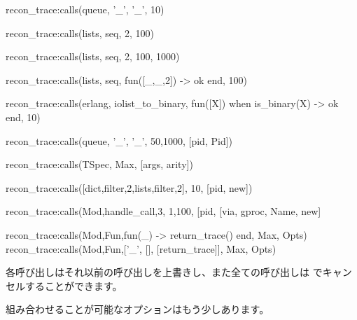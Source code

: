 \begin{VerbatimErl}
recon_trace:calls({queue, '_', '_'}, 10)

recon_trace:calls({lists, seq, 2}, 100)

recon_trace:calls({lists, seq, 2}, {100, 1000})

recon_trace:calls({lists, seq, fun([_,_,2]) -> ok end}, 100)

recon_trace:calls({erlang, iolist_to_binary,
                   fun([X]) when is_binary(X) -> ok end},
                  10)

recon_trace:calls({queue, '_', '_'}, {50,1000}, [{pid, Pid}])

recon_trace:calls(TSpec, Max, [{args, arity}])

recon_trace:calls([{dict,filter,2},{lists,filter,2}], 10, [{pid, new}])

recon_trace:calls({Mod,handle_call,3}, {1,100}, [{pid, [{via, gproc, Name}, new]}

recon_trace:calls({Mod,Fun,fun(_) -> return_trace() end}, Max, Opts)
recon_trace:calls({Mod,Fun,[{'_', [], [{return_trace}]}]}, Max, Opts)

\end{VerbatimErl}

各呼び出しはそれ以前の呼び出しを上書きし、また全ての呼び出しは  でキャンセルすることができます。

組み合わせることが可能なオプションはもう少しあります。


